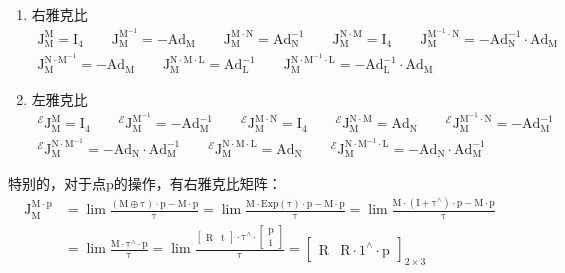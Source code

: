 \documentclass[12pt, onecolumn]{article}
\newcommand\liehat[1]{#1^{\land}}
\newcommand\Exp[1]{\mathrm{Exp}\left( #1\right) }
\newcommand\bsm[1]{\boldsymbol{\mathrm{#1}}}
\begin{document}
	\begin{enumerate}
	\item 右雅克比
	\begin{equation}
	\begin{gathered}
	\bsm{J}_{\bsm{M}}^{\bsm{M}}=\bsm{I}_4
	\qquad
	\bsm{J}_{\bsm{M}}^{\bsm{M}^{-1}}=-\bsm{Ad}_{\bsm{M}}
	\qquad
	\bsm{J}_{\bsm{M}}^{\bsm{M}\cdot\bsm{N}}=\bsm{Ad}_{\bsm{N}}^{-1}
	\qquad
	\bsm{J}_{\bsm{M}}^{\bsm{N}\cdot\bsm{M}}=\bsm{I}_4
	\qquad
	\bsm{J}_{\bsm{M}}^{\bsm{M}^{-1}\cdot\bsm{N}}=-\bsm{Ad}_{\bsm{N}}^{-1}\cdot\bsm{Ad}_{\bsm{M}}
	\\
	\bsm{J}_{\bsm{M}}^{\bsm{N}\cdot\bsm{M}^{-1}}=-\bsm{Ad}_{\bsm{M}}
	\qquad
	\bsm{J}_{\bsm{M}}^{\bsm{N}\cdot\bsm{M}\cdot\bsm{L}}=\bsm{Ad}_{\bsm{L}}^{-1}
	\qquad
	\bsm{J}_{\bsm{M}}^{\bsm{N}\cdot\bsm{M}^{-1}\cdot\bsm{L}}=
	-\bsm{Ad}_{\bsm{L}}^{-1}\cdot\bsm{Ad}_{\bsm{M}}
	\end{gathered}
	\end{equation}

	\item 左雅克比
	\begin{equation}
	\begin{gathered}
	^\mathcal{E}\bsm{J}_{\bsm{M}}^{\bsm{M}}=\bsm{I}_4
	\qquad
	^\mathcal{E}\bsm{J}_{\bsm{M}}^{\bsm{M}^{-1}}=-\bsm{Ad}_{\bsm{M}}^{-1}
	\qquad
	^\mathcal{E}\bsm{J}_{\bsm{M}}^{\bsm{M}\cdot\bsm{N}}=\bsm{I}_4
	\qquad
	^\mathcal{E}\bsm{J}_{\bsm{M}}^{\bsm{N}\cdot\bsm{M}}=\bsm{Ad}_{\bsm{N}}
	\qquad
	^\mathcal{E}\bsm{J}_{\bsm{M}}^{\bsm{M}^{-1}\cdot\bsm{N}}=-\bsm{Ad}_{\bsm{M}}^{-1}
	\\
	^\mathcal{E}\bsm{J}_{\bsm{M}}^{\bsm{N}\cdot\bsm{M}^{-1}}=-\bsm{Ad}_{\bsm{N}}\cdot\bsm{Ad}_{\bsm{M}}^{-1}
	\qquad
	^\mathcal{E}\bsm{J}_{\bsm{M}}^{\bsm{N}\cdot\bsm{M}\cdot\bsm{L}}=\bsm{Ad}_{\bsm{N}}
	\qquad
	^\mathcal{E}\bsm{J}_{\bsm{M}}^{\bsm{N}\cdot\bsm{M}^{-1}\cdot\bsm{L}}=-\bsm{Ad}_{\bsm{N}}\cdot\bsm{Ad}_{\bsm{M}}^{-1}
	\end{gathered}
	\end{equation}
	\end{enumerate}
	特别的，对于点$\bsm{p}$的操作，有右雅克比矩阵：
	\begin{equation}
	\begin{aligned}
	\bsm{J}_{\bsm{M}}^{\bsm{M}\cdot\bsm{p}}&=
	\lim\frac{\left( \bsm{M}\oplus\bsm{\tau}\right) \cdot\bsm{p}- \bsm{M}\cdot\bsm{p}}{\bsm{\tau}}=
	\lim\frac{\bsm{M}\cdot\Exp{\bsm{\tau}} \cdot\bsm{p}- \bsm{M}\cdot\bsm{p}}{\bsm{\tau}}
	=\lim\frac{\bsm{M}\cdot\left( \bsm{I}+\liehat{\bsm{\tau}}\right)  \cdot\bsm{p}- \bsm{M}\cdot\bsm{p}}{\bsm{\tau}}
	\\&
	=\lim\frac{\bsm{M}\cdot\liehat{\bsm{\tau}}  \cdot\bsm{p}}{\bsm{\tau}}
	=\lim\frac{\begin{bmatrix}
	\bsm{R}&\bsm{t}
	\end{bmatrix}\cdot\liehat{\bsm{\tau}}  \cdot	\begin{bmatrix}
	\bsm{p}\\1
	\end{bmatrix}}{\bsm{\tau}}
	=\begin{bmatrix}
	\bsm{R}&\bsm{R}\cdot\liehat{1}\cdot\bsm{p}
	\end{bmatrix}_{2\times 3}
	\end{aligned}
	\end{equation}
\end{document}
